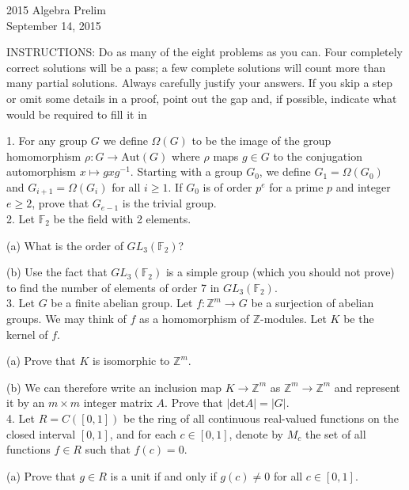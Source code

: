 \documentclass[11pt]{article}
\newcommand{\Z}{\mathbb{Z}}
\newcommand{\F}{\mathbb{F}}
\begin{document}
\begin{center}
\Large 2015 Algebra Prelim\\
\normalsize September 14, 2015
\end{center}
\vspace{1em}

INSTRUCTIONS: Do as many of the eight problems as you can. Four completely
correct solutions will be a pass; a few complete solutions will count more than many
partial solutions. Always carefully justify your answers. If you skip a step or omit
some details in a proof, point out the gap and, if possible, indicate what would be
required to fill it in\\
\vspace{1em}

1. For any group $G$ we define $\Omega(G)$ to be the image of the group homomorphism
$\rho : G \to \mbox{Aut}(G)$ where $\rho$ maps $g\in G$ to the conjugation automorphism $x \mapsto gxg^{-1}$.
Starting with a group $G_0$, we define $G_1 = \Omega(G_0)$ and $G_{i+1} = \Omega(G_i)$ for all $i \ge 1$. If $G_0$
is of order $p^e$ for a prime $p$ and integer $e \ge 2$, prove that $G_{e−1}$ is the trivial group.\\

2. Let $\F_2$ be the field with 2 elements.

(a) What is the order of $GL_3(\F_2)$?

(b) Use the fact that $GL_3(\F_2)$ is a simple group (which you should not prove) to find the number of elements of order 7 in $GL_3(\F_2)$. \\


3. Let $G$ be a finite abelian group. Let $f : \Z^m \to G$ be a surjection of abelian groups.
We may think of $f$ as a homomorphism of $\Z$-modules. Let $K$ be the kernel of $f$.

(a) Prove that $K$ is isomorphic to $\Z^m$.

(b) We can therefore write an inclusion map $K\to \Z^m$ as $\Z^m\to \Z^m$ and represent it by an $m\times m$ integer matrix $A$. Prove that $|\mbox{det} A| = |G|$. \\

4. Let $R = C([0,1])$ be the ring of all continuous real-valued functions on the closed
interval $[0,1]$, and for each $c \in [0,1]$, denote by $M_c$ the set of all functions $f\in R$ such
that $f(c) = 0$.

(a) Prove that $g\in R$ is a unit if and only if $g(c) \neq 0$ for all $c\in [0,1]$. 
\end{document}
